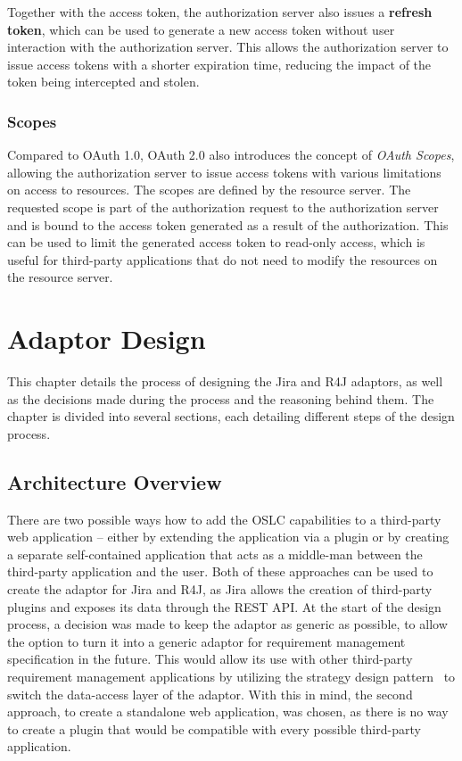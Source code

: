 Together with the access token, the authorization server also issues a \textbf{refresh token}, which can be used to generate a new access token without user interaction with the authorization server. This allows the authorization server to issue access tokens with a shorter expiration time, reducing the impact of the token being intercepted and stolen.

\subsection*{Scopes}
Compared to OAuth 1.0, OAuth 2.0 also introduces the concept of \emph{OAuth Scopes}, allowing the authorization server to issue access tokens with various limitations on access to resources. The scopes are defined by the resource server. The requested scope is part of the authorization request to the authorization server and is bound to the access token generated as a result of the authorization. This can be used to limit the generated access token to read-only access, which is useful for third-party applications that do not need to modify the resources on the resource server.


\chapter{Adaptor Design}
\label{chapter:adaptor_design}
This chapter details the process of designing the Jira and R4J adaptors, as well as the decisions made during the process and the reasoning behind them. The chapter is divided into several sections, each detailing different steps of the design process.

\section{Architecture Overview}
There are two possible ways how to add the OSLC capabilities to a third-party web application -- either by extending the application via a plugin or by creating a separate self-contained application that acts as a middle-man between the third-party application and the user. Both of these approaches can be used to create the adaptor for Jira and R4J, as Jira allows the creation of third-party plugins and exposes its data through the REST API. At the start of the design process, a decision was made to keep the adaptor as generic as possible, to allow the option to turn it into a generic adaptor for requirement management specification in the future. This would allow its use with other third-party requirement management applications by utilizing the strategy design pattern \cite{strategy_design_pattern} to switch the data-access layer of the adaptor. With this in mind, the second approach, to create a standalone web application, was chosen, as there is no way to create a plugin that would be compatible with every possible third-party application.

